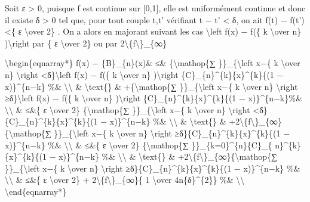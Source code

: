 \documentclass[]{article}
\begin{document}
Soit ε \textgreater{} 0, puisque f est continue sur {[}0,1{]}, elle est
uniformément continue et donc il existe δ \textgreater{} 0 tel que, pour
tout couple t,t' vérifiant \textbar{}t − t'\textbar{} \textless{} δ, on
ait \textbar{}f(t) − f(t')\textbar{} \textless{}\{ ε
\textbackslash{}over 2\} . On a alors en majorant suivant les cas
\textbackslash{}left \textbar{}f(x) − f(\{ k \textbackslash{}over n\}
)\textbackslash{}right \textbar{} par \{ ε \textbackslash{}over 2\} ou
par 2\textbackslash{}\textbar{}\{f\textbackslash{}\textbar{}\}\_\{∞\}

\textbackslash{}begin\{eqnarray*\} \textbar{}f(x) −
\{B\}\_\{n\}(x)\textbar{}\& ≤\& \{\textbackslash{}mathop\{∑
\}\}\_\{\textbackslash{}left \textbar{}x−\{ k \textbackslash{}over n\}
\textbackslash{}right \textbar{}\textless{}δ\}\textbackslash{}left
\textbar{}f(x) − f(\{ k \textbackslash{}over n\} )\textbackslash{}right
\textbar{}\{C\}\_\{n\}\^{}\{k\}\{x\}\^{}\{k\}\{(1 − x)\}\^{}\{n−k\} \%\&
\textbackslash{}\textbackslash{} \& \textbackslash{}text\{\} \&
+\{\textbackslash{}mathop\{∑ \}\}\_\{\textbackslash{}left \textbar{}x−\{
k \textbackslash{}over n\} \textbackslash{}right
\textbar{}≥δ\}\textbackslash{}left \textbar{}f(x) − f(\{ k
\textbackslash{}over n\} )\textbackslash{}right
\textbar{}\{C\}\_\{n\}\^{}\{k\}\{x\}\^{}\{k\}\{(1 − x)\}\^{}\{n−k\}\%\&
\textbackslash{}\textbackslash{} \& ≤\&\{ ε \textbackslash{}over 2\}
\{\textbackslash{}mathop\{∑ \}\}\_\{\textbackslash{}left \textbar{}x−\{
k \textbackslash{}over n\} \textbackslash{}right
\textbar{}\textless{}δ\}\{C\}\_\{n\}\^{}\{k\}\{x\}\^{}\{k\}\{(1 −
x)\}\^{}\{n−k\} \%\& \textbackslash{}\textbackslash{} \&
\textbackslash{}text\{\} \&
+2\textbackslash{}\textbar{}\{f\textbackslash{}\textbar{}\}\_\{∞\}\{\textbackslash{}mathop\{∑
\}\}\_\{\textbackslash{}left \textbar{}x−\{ k \textbackslash{}over n\}
\textbackslash{}right
\textbar{}≥δ\}\{C\}\_\{n\}\^{}\{k\}\{x\}\^{}\{k\}\{(1 − x)\}\^{}\{n−k\}
\%\& \textbackslash{}\textbackslash{} \& ≤\&\{ ε \textbackslash{}over
2\} \{\textbackslash{}mathop\{∑ \}\}\_\{k=0\}\^{}\{n\}\{C\}\_\{
n\}\^{}\{k\}\{x\}\^{}\{k\}\{(1 − x)\}\^{}\{n−k\} \%\&
\textbackslash{}\textbackslash{} \& \textbackslash{}text\{\} \&
+2\textbackslash{}\textbar{}\{f\textbackslash{}\textbar{}\}\_\{∞\}\{\textbackslash{}mathop\{∑
\}\}\_\{\textbackslash{}left \textbar{}x−\{ k \textbackslash{}over n\}
\textbackslash{}right
\textbar{}≥δ\}\{C\}\_\{n\}\^{}\{k\}\{x\}\^{}\{k\}\{(1 − x)\}\^{}\{n−k\}
\%\& \textbackslash{}\textbackslash{} \& ≤\&\{ ε \textbackslash{}over
2\} +
2\textbackslash{}\textbar{}\{f\textbackslash{}\textbar{}\}\_\{∞\}\{ 1
\textbackslash{}over 4n\{δ\}\^{}\{2\}\} \%\&
\textbackslash{}\textbackslash{} \textbackslash{}end\{eqnarray*\}
\end{document}
